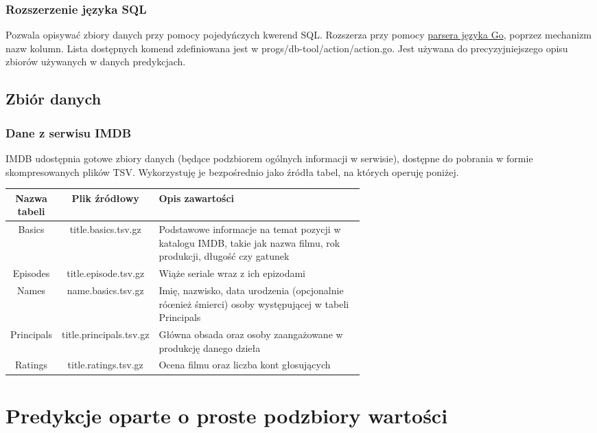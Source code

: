 \documentclass{article}
\begin{document}
\subsubsection{Rozszerzenie języka SQL}

Pozwala opisywać zbiory danych przy pomocy pojedyńczych kwerend SQL. Rozszerza przy pomocy \href{https://pkg.go.dev/go}{parsera języka Go}, poprzez mechanizm nazw kolumn. Lista dostępnych komend zdefiniowana jest w progs/db-tool/action/action.go. Jest używana do precyzyjniejszego opisu zbiorów używanych w danych predykcjach.

\subsection{Zbiór danych}

\subsubsection{Dane z serwisu IMDB}

IMDB udostępnia gotowe zbiory danych (będące podzbiorem ogólnych informacji w serwisie), dostępne do pobrania w formie skompresowanych plików TSV. Wykorzystuję je bezpośrednio jako źródła tabel, na których operuję poniżej.

\begin{center}
\begin{tabular}{ |c|c| p{0.6\linewidth} | }
	\hline
	\textbf{Nazwa tabeli} & \textbf{Plik źródłowy} & \textbf{Opis zawartości} \\ \hline
	Basics & title.basics.tsv.gz & Podstawowe informacje na temat pozycji w katalogu IMDB, takie jak nazwa filmu, rok produkcji, długość czy gatunek \\ \hline
	Episodes & title.episode.tsv.gz & Wiąże seriale wraz z ich epizodami \\ \hline
	Names & name.basics.tsv.gz & Imię, nazwisko, data urodzenia (opcjonalnie róœnież śmierci) osoby występującej w tabeli Principals \\ \hline
	Principals & title.principals.tsv.gz & Główna obsada oraz osoby zaangażowane w produkcję danego dzieła \\ \hline
	Ratings & title.ratings.tsv.gz & Ocena filmu oraz liczba kont głosujących \\ \hline
\end{tabular}
\end{center}

\section{Predykcje oparte o proste podzbiory wartości}
\end{document}
